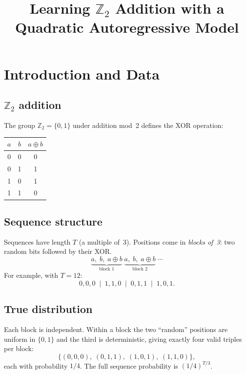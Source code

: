 \documentclass[11pt]{article}
\title{Learning $\mathbb{Z}_2$ Addition with a Quadratic Autoregressive Model}
\begin{document}
\maketitle

\section{Introduction and Data}\label{sec:intro}

\subsection{$\mathbb{Z}_2$ addition}

The group $\mathbb{Z}_2 = \{0,1\}$ under addition mod~2 defines the XOR
operation:
\begin{center}
\begin{tabular}{cc|c}
\toprule
$a$ & $b$ & $a \oplus b$ \\
\midrule
0 & 0 & 0 \\
0 & 1 & 1 \\
1 & 0 & 1 \\
1 & 1 & 0 \\
\bottomrule
\end{tabular}
\end{center}

\subsection{Sequence structure}

Sequences have length $T$ (a multiple of~3).  Positions come in
\emph{blocks of~3}: two random bits followed by their XOR.
\begin{equation}\label{eq:block}
  \underbrace{a,\; b,\; a \oplus b}_{\text{block 1}}\;
  \underbrace{a,\; b,\; a \oplus b}_{\text{block 2}}\;
  \cdots
\end{equation}
For example, with $T = 12$:
\[
  0,0,0 \;\mid\; 1,1,0 \;\mid\; 0,1,1 \;\mid\; 1,0,1.
\]

\subsection{True distribution}

Each block is independent.  Within a block the two ``random'' positions
are uniform in $\{0,1\}$ and the third is deterministic, giving exactly
four valid triples per block:
\[
  \{(0,0,0),\;(0,1,1),\;(1,0,1),\;(1,1,0)\},
\]
each with probability $1/4$.  The full sequence probability is
$(1/4)^{T/3}$.
\end{document}
